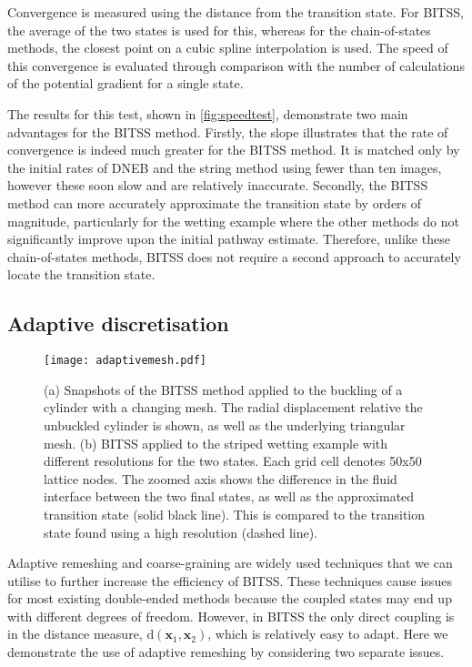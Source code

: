 \documentclass[twocolumn,10pt]{revtex4}
\begin{document}
Convergence is measured using the distance from the transition state.
For BITSS, the average of the two states is used for this, whereas for the chain-of-states methods, the closest point on a cubic spline interpolation is used.
The speed of this convergence is evaluated through comparison with the number of calculations of the potential gradient for a single state.

The results for this test, shown in \cref{fig:speedtest}, demonstrate two main advantages for the BITSS method.
Firstly, the slope illustrates that the rate of convergence is indeed much greater for the BITSS method.
It is matched only by the initial rates of DNEB and the string method using fewer than ten images, however these soon slow and are relatively inaccurate.
Secondly, the BITSS method can more accurately approximate the transition state by orders of magnitude, particularly for the wetting example where the other methods do not significantly improve upon the initial pathway estimate.
Therefore, unlike these chain-of-states methods, BITSS does not require a second approach to accurately locate the transition state.


\subsection{Adaptive discretisation}\label{sec:adaptive}
\begin{figure}[tb]
  \texttt{[image: adaptivemesh.pdf]}
  \caption{\label{fig:adaptivemesh}
    (a) Snapshots of the BITSS method applied to the buckling of a cylinder with a changing mesh.
        The radial displacement relative the unbuckled cylinder is shown, as well as the underlying triangular mesh.
    (b) BITSS applied to the striped wetting example with different resolutions for the two states.
        Each grid cell denotes 50x50 lattice nodes.
        The zoomed axis shows the difference in the fluid interface between the two final states, as well as the approximated transition state (solid black line).
        This is compared to the transition state found using a high resolution (dashed line).
  }
\end{figure}

Adaptive remeshing and coarse-graining are widely used techniques that we can utilise to further increase the efficiency of BITSS.
These techniques cause issues for most existing double-ended methods because the coupled states may end up with different degrees of freedom.
However, in BITSS the only direct coupling is in the distance measure, $\mathrm{d}(\bm{x}_1,\bm{x}_2)$, which is relatively easy to adapt.
Here we demonstrate the use of adaptive remeshing by considering two separate issues.
\end{document}
